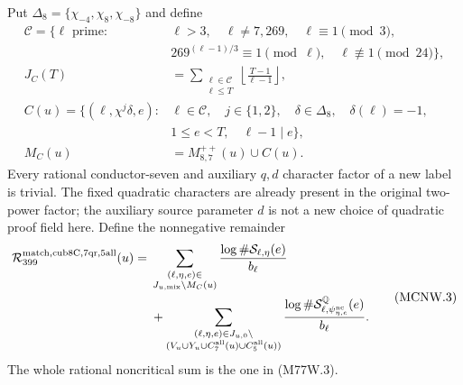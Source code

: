 Put $\Delta_8=\{\chi_{-4},\chi_8,\chi_{-8}\}$ and define
\[
 \begin{split}
 \mathscr C=\{\ell\text{ prime}:{}&
        \ell>3,\quad\ell\ne7,269,\quad\ell\equiv1\pmod3,\\
       &269^{(\ell-1)/3}\equiv1\pmod\ell,\quad
                         \ell\not\equiv1\pmod{24}\},\\
 J_C(T)&=\sum_{\substack{\ell\in\mathscr C\\\ell\leq T}}
                       \left\lfloor\frac{T-1}{\ell-1}\right\rfloor,\\
 C(u)=\{(\ell,\chi^j\delta,e):{}&
       \ell\in\mathscr C,\quad j\in\{1,2\},\quad\delta\in\Delta_8,
       \quad\delta(\ell)=-1,\\
       &1\leq e<T,\quad\ell-1\mid e\},\\
 M_C(u)&=M_{8,7}^{++}(u)\cup C(u).
 \end{split}\tag{MCNW.2}
\]
Every rational conductor-seven and auxiliary $q,d$ character factor
of a new label is trivial. The fixed quadratic characters are already
present in the original two-power factor; the auxiliary source
parameter $d$ is not a new choice of quadratic proof field here.
Define the nonnegative remainder
\[
 \begin{split}
 \mathcal R_{399}^{\rm match,cub8C,7qr,5all}(u)={}&
  \sum_{\substack{(\ell,\eta,e)\in\\ J_{u,\rm mix}\setminus M_C(u)}}
                  \frac{\log\#\mathcal S_{\ell,\eta}(e)}{b_\ell}\\
 &+\sum_{\substack{(\ell,\eta,e)\in J_{u,0}\setminus\\
       (V_u\cup Y_u\cup C_7^{\rm all}(u)\cup C_5^{\rm all}(u))}}
       \frac{\log\#\mathcal S^{\mathbb Q}_{\ell,
                             \psi_{\eta,e}^{\rm nc}}(e)}{b_\ell}.
 \end{split}\tag{MCNW.3}
\]
The whole rational noncritical sum is the one in (M77W.3).

